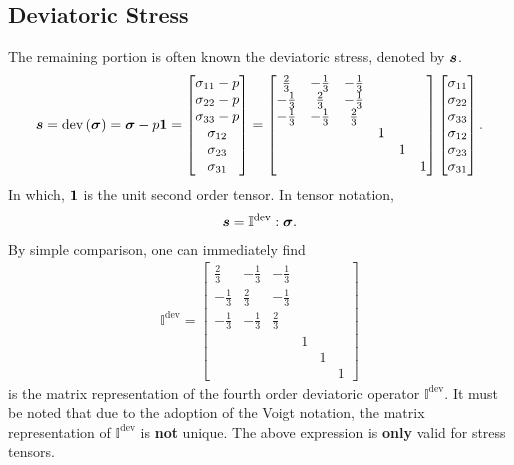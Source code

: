 \subsection{Deviatoric Stress}
The remaining portion is often known the deviatoric stress, denoted by $\bm{s}$.
\begin{gather}
\bm{s}=\text{dev}\left(\bm{\sigma}\right)=\bm{\sigma}-p\bm{1}=\begin{bmatrix}
\sigma_{11}-p\\\sigma_{22}-p\\\sigma_{33}-p\\\sigma_{12}\\\sigma_{23}\\\sigma_{31}
\end{bmatrix}=\begin{bmatrix}
\frac{2}{3}&-\frac{1}{3}&-\frac{1}{3}&&&\\
-\frac{1}{3}&\frac{2}{3}&-\frac{1}{3}&&&\\
-\frac{1}{3}&-\frac{1}{3}&\frac{2}{3}&&&\\
&&&1&&\\
&&&&1&\\
&&&&&1
\end{bmatrix}\begin{bmatrix}
\sigma_{11}\\\sigma_{22}\\\sigma_{33}\\\sigma_{12}\\\sigma_{23}\\\sigma_{31}
\end{bmatrix}.
\end{gather}
In which, $\bm{1}$ is the unit second order tensor. In tensor notation,
\begin{gather}
\bm{s}=\mathbb{I}^\text{dev}:\bm{\sigma}.
\end{gather}
By simple comparison, one can immediately find
\begin{gather}
\mathbb{I}^\text{dev}=\begin{bmatrix}
\frac{2}{3}&-\frac{1}{3}&-\frac{1}{3}&&&\\
-\frac{1}{3}&\frac{2}{3}&-\frac{1}{3}&&&\\
-\frac{1}{3}&-\frac{1}{3}&\frac{2}{3}&&&\\
&&&1&&\\
&&&&1&\\
&&&&&1
\end{bmatrix}
\end{gather}
is the matrix representation of the fourth order deviatoric operator $\mathbb{I}^\text{dev}$. It must be noted that due to the adoption of the Voigt notation, the matrix representation of $\mathbb{I}^\text{dev}$ is \textbf{not} unique.
The above expression is \textbf{only} valid for stress tensors.
